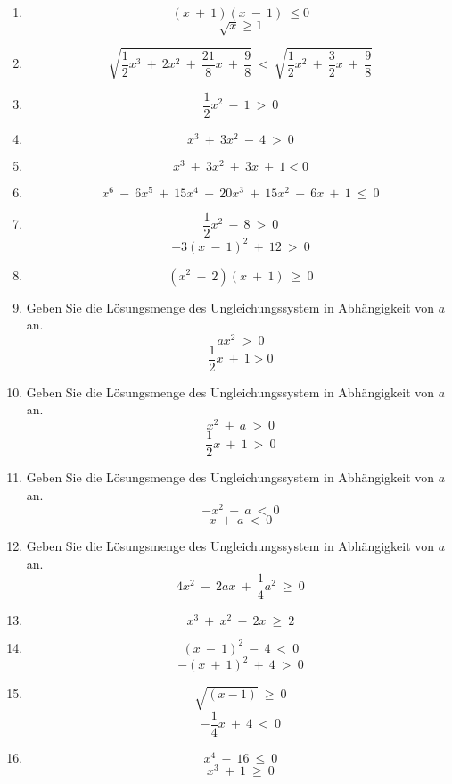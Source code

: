 \begin{enumerate}
\item
\[(x \ + \ 1)(x \ - \ 1) \ \leq 0\]
\[\sqrt x \geq 1 \]


\item
\[ \sqrt{\frac 1 2 x^3 \ + \ 2x^2 \ + \ \frac {21} 8 x \ + \ \frac 9 8} \ < \ \sqrt{\frac 1 2 x^2 \ + \ \frac 3 2 x \ + \ \frac 9 8 } \]

\item
\[\frac 1 2 x^2 \ - \ 1 \ > \ 0\]

\item
\[x^3 \ + \ 3x^2 \ - \ 4 \ > \ 0\]

\item
\[x^3 \ + \ 3x^2 \ + \ 3x \ + \ 1 < 0\]

\item
\[x^6 \ - \ 6x^5 \ + \ 15x^4 \ - \ 20x^3 \ + \ 15x^2 \ - \ 6x \ + \ 1 \ \leq \ 0\]

\item
\[\frac 1 2 x^2 \ - \ 8 \ > \ 0\]
\[-3(x \ - \ 1)^2 \ + \ 12 \ > \ 0\]

\item
\[(x^2 \ - \ 2)(x \ + \ 1) \ \geq \ 0\]

\item Geben Sie die Lösungsmenge des Ungleichungssystem in Abhängigkeit von $ a $ an.
\[ax^2 \ > \ 0\]
\[\frac 1 2 x \ + \ 1 > 0\]

\item Geben Sie die Lösungsmenge des Ungleichungssystem in Abhängigkeit von $ a $ an.
\[x^2 \ + \ a \ > \ 0\]
\[\frac 1 2 x \ + \ 1 \ > \ 0\]

\item Geben Sie die Lösungsmenge des Ungleichungssystem in Abhängigkeit von $ a $ an.
\[-x^2 \ + \ a \ < \ 0\]
\[x \ + \ a \ < \ 0\]

\item Geben Sie die Lösungsmenge des Ungleichungssystem in Abhängigkeit von $ a $ an.
\[4x^2 \ - \ 2ax \ + \ \frac 1 4 a^2 \ \geq \ 0\]

\item
\[x^3 \ + \ x^2 \ - \ 2x \ \geq \ 2\]

\item
\[(x \ - \ 1)^2 \ - \ 4 \ < \ 0\]
\[-(x \ + \ 1)^2 \ + \ 4 \ > \ 0\]

\item
\[\sqrt {(x-1)} \ \geq \ 0\]
\[- \frac 1 4 x \ + \ 4 \ < \ 0\]

\item
\[x^4 \ - \ 16 \ \leq \ 0\]
\[x^3 \ + \ 1 \ \geq \ 0\]

\end{enumerate}
\newpage

